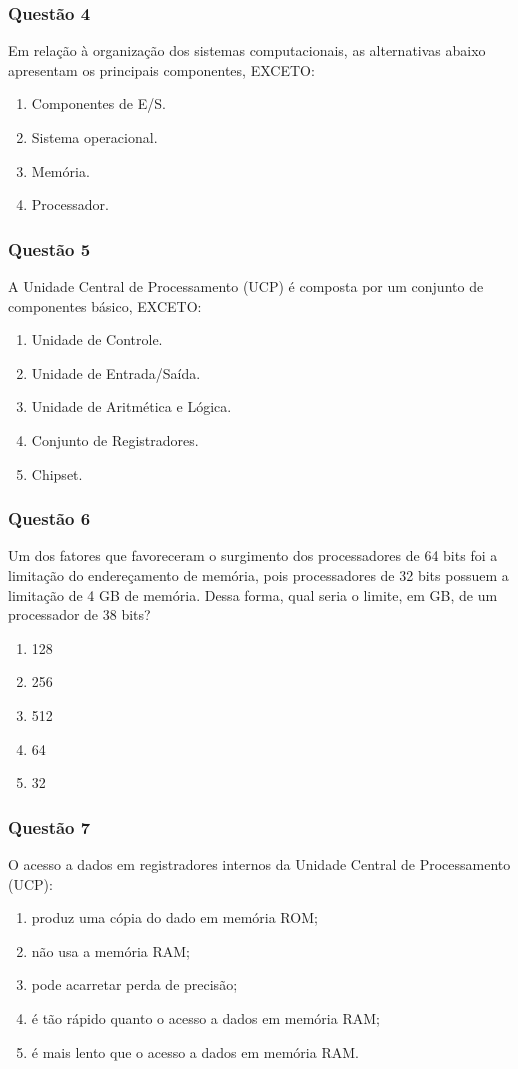 \documentclass[	aspectratio=169,
				xcolor=table]{beamer}
\begin{document}
	\begin{frame}
		\frametitle{Questão 4}
		Em relação à organização dos sistemas computacionais, as alternativas abaixo apresentam os principais componentes, EXCETO: 
		\begin{enumerate}[a]
			\item Componentes de E/S.
			\item Sistema operacional.
			\item Memória.
			\item Processador.
		\end{enumerate}
	\end{frame}
	
	\begin{frame}
		\frametitle{Questão 5}
		A Unidade Central de Processamento (UCP) é composta por um conjunto de componentes básico, EXCETO: 
		\begin{enumerate}[a]
			\item	Unidade de Controle.
			\item	Unidade de Entrada/Saída.
			\item	Unidade de Aritmética e Lógica. 
			\item	Conjunto de Registradores. 
			\item	Chipset.			
		\end{enumerate}
	\end{frame}

	\begin{frame}
		\frametitle{Questão 6}
		Um dos fatores que favoreceram o surgimento dos processadores de 64 bits foi a limitação do endereçamento de memória, pois processadores de 32 bits possuem a limitação de 4 GB de memória. Dessa forma, qual seria o limite, em GB, de um processador de 38 bits?
		\begin{enumerate}[a]
			\item	128
			\item	256
			\item	512
			\item	64
			\item	32  
		  	
		\end{enumerate}  
	\end{frame}
	
	\begin{frame}
		\frametitle{Questão 7}
		O acesso a dados em registradores internos da Unidade Central de Processamento (UCP): 
		\begin{enumerate}[a]
			\item produz uma cópia do dado em memória ROM; 
			\item não usa a memória RAM;
			\item pode acarretar perda de precisão;
			\item é tão rápido quanto o acesso a dados em memória RAM; 
			\item é mais lento que o acesso a dados em memória RAM.			
		\end{enumerate}
	\end{frame}
	
\end{document}
